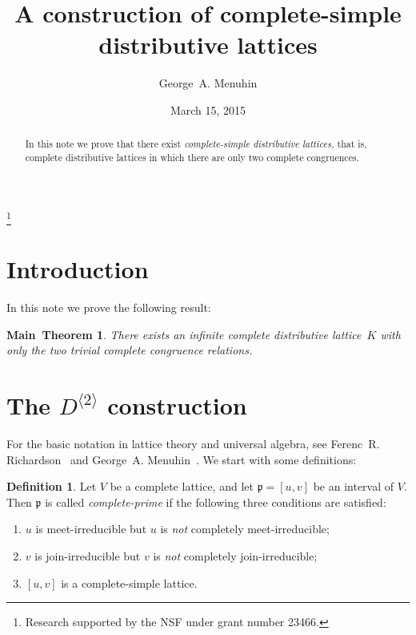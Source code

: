 \documentclass{amsart}
\theoremstyle{plain}
\newtheorem*{main}{Main~Theorem}
\theoremstyle{definition}
\newtheorem{definition}{Definition}
\theoremstyle{remark}
\numberwithin{equation}{section}
\begin{document}
\title[Complete-simple distributive lattices]
      {A construction of complete-simple\\  
       distributive lattices}
\author{George~A. Menuhin}
\address{Computer Science Department\\
         University of Winnebago\\
         Winnebago, MN 53714} 
\thanks{Research supported by the NSF under grant number
23466.}  
\date{March 15, 2015}
\begin{abstract}
   In this note we prove that there exist \emph{complete-simple distributive
   lattices,} that is, complete distributive lattices in which there are 
   only two complete congruences. 
\end{abstract}

\maketitle

\section{Introduction}\label{S:intro} 
In this note we prove the following result:

\begin{main} 
   There exists an infinite complete distributive lattice~$K$ with only 
   the two trivial complete congruence relations.
\end{main}

\section{The $D^{\langle 2 \rangle}$ construction}\label{S:Ds} 
For the basic notation in lattice theory and universal algebra, see Ferenc~R.
Richardson~\cite{fR82} and George~A. Menuhin~\cite{gM68}.  We start with some
definitions:

\begin{definition}\label{D:prime}
   Let $V$ be a complete lattice, and let $\mathfrak{p} = [u, v]$ be
   an interval of $V$.  Then $\mathfrak{p}$ is called 
   \emph{complete-prime} if the following three conditions are satisfied:
   \begin{enumerate}
      \item $u$ is meet-irreducible but $u$ is \emph{not}
         completely meet-irreducible;\label{m-i}
      \item $v$ is join-irreducible but $v$ is \emph{not} 
         completely join-irreducible;\label{j-i}
      \item $[u, v]$ is a complete-simple lattice.\label{c-s}
   \end{enumerate}
\end{definition}
\end{document}
